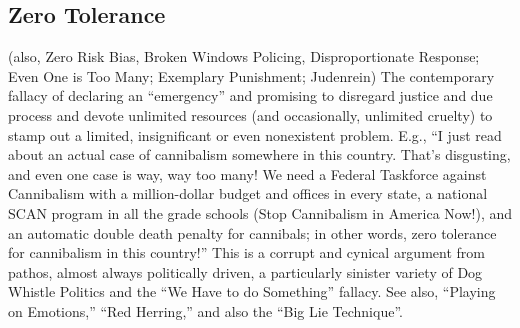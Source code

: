 \documentclass[10pt,a4paper,british]{article}
\begin{document}
\begin{multicols}{2}
    \subsection{Zero Tolerance} (also, Zero Risk Bias, Broken Windows Policing, Disproportionate Response; Even One is Too Many; Exemplary Punishment; Judenrein) The contemporary fallacy of declaring an ``emergency'' and promising to disregard justice and due process and devote unlimited resources (and occasionally, unlimited cruelty) to stamp out a limited, insignificant or even nonexistent problem.  E.g., ``I just read about an actual case of cannibalism somewhere in this country. That's disgusting, and even one case is way, way too many! We need a Federal Taskforce against Cannibalism with a million{-}dollar budget and offices in every state, a national SCAN program in all the grade schools (Stop Cannibalism in America Now!), and an automatic double death penalty for cannibals; in other words, zero tolerance for cannibalism in this country!'' This is a corrupt and cynical argument from pathos, almost always politically driven, a particularly sinister variety of Dog Whistle Politics and the ``We Have to do Something'' fallacy. See also, ``Playing on Emotions,'' ``Red Herring,'' and also the ``Big Lie Technique''.  

\end{multicols} 
\end{document}
